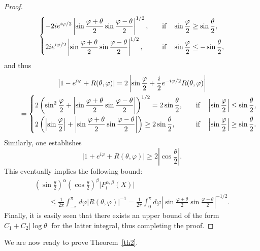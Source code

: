 \documentclass[10pt,a4paper]{amsart}
\begin{document}
\begin{proof}
\[\begin{cases}
\displaystyle  -2i e^{i\varphi/2} \left|\sin\frac{\varphi+\theta}2 \sin\frac{\varphi-\theta}2\right|^{1/2},\quad  &
\displaystyle  \mbox{if}\quad \sin\frac\varphi2\geq\sin\frac\theta2 ,\vspace{1mm}\\
\displaystyle  2i e^{i\varphi/2} \left|\sin\frac{\varphi+\theta}2 \sin\frac{\varphi-\theta}2\right|^{1/2},\quad &
\displaystyle   \mbox{if}\quad \sin\frac\varphi2\leq-\sin\frac\theta2 ,
\end{cases}
\]
and thus
\begin{gather*}
\big|1-e^{i\varphi}+R(\theta,\varphi)|
 =2\left|\sin\frac\varphi2+\frac i2 e^{-i\varphi/2} R(\theta,\varphi)\right|\\
\qquad =\begin{cases}
\displaystyle 2\left(\sin^2\frac\varphi2+\left|\sin\frac{\varphi+\theta}2
\sin\frac{\varphi-\theta}2\right|\right)^{1/2}=2\sin\frac\theta2, \quad&
\displaystyle  \mbox{if}\quad
\left|\sin\frac\varphi2\right|\leq\sin\frac\theta2 ,\vspace{1mm}\\
\displaystyle  2\left(\left|\sin\frac\varphi2\right|+\left|\sin\frac{\varphi+\theta}2
\sin\frac{\varphi-\theta}2\right|\right)\geq2\sin\frac\theta2, \quad &
\displaystyle  \mbox{if}\quad
\left|\sin\frac\varphi2\right|\geq\sin\frac\theta2 .
\end{cases}
\end{gather*}
Similarly, one establishes
\[
\big|1+e^{i\varphi}+R(\theta,\varphi)|\geq2\left|\cos\frac\theta2\right| .
\]
This eventually implies the following bound:
\begin{gather*}
\left(\sin\frac\theta2\right)^\alpha \left(\cos\frac\theta2\right)^\beta
\big|P_l^{\alpha,\beta}(X)\big|\\
\qquad{} \leq \frac1{2\pi}\int_{-\pi}^\pi d\varphi
\big|R(\theta,\varphi)\big|^{-1}
=\frac1{2\pi}\int_0^\pi d\varphi
\left|\sin\frac{\varphi+\theta}2 \sin\frac{\varphi-\theta}2\right|^{-1/2}.
\end{gather*}
Finally, it is easily seen that there exists an upper bound of the
form $ C_1 + C_2 |\log\theta |$ for the latter integral, thus
completing the proof.
\end{proof}


We are now ready to prove Theorem~\ref{th2}.
\end{document}
